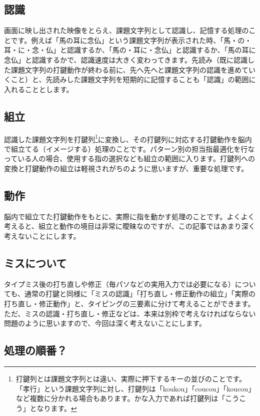 \subsection{認識}

画面に映し出された映像をとらえ、課題文字列として認識し、記憶する処理のことです。例えば「馬の耳に念仏」という課題文字列が表示された時、「馬・の・耳・に・念・仏」と認識するか、「馬の・耳に・念仏」と認識するか、「馬の耳に念仏」と認識するかで、認識速度は大きく変わってきます。先読み（既に認識した課題文字列の打鍵動作が終わる前に、先へ先へと課題文字列の認識を進めていくこと）と、先読みした課題文字列を短期的に記憶することも「認識」の範囲に入れることとします。

\subsection{組立}

認識した課題文字列を打鍵列\footnote{打鍵列とは課題文字列とは違い、実際に押下するキーの並びのことです。「孝行」という課題文字列に対し、打鍵列は「koukou」「coucou」「koucou」など複数に分かれる場合もあります。かな入力であれば打鍵列は「こうこう」となります。}に変換し、その打鍵列に対応する打鍵動作を脳内で組立てる（イメージする）処理のことです。パターン別の担当指最適化を行なっている人の場合、使用する指の選択なども組立の範囲に入ります。打鍵列への変換と打鍵動作の組立は軽視されがちのように思いますが、重要な処理です。

\subsection{動作}

脳内で組立てた打鍵動作をもとに、実際に指を動かす処理のことです。よくよく考えると、組立と動作の境目は非常に曖昧なのですが、この記事ではあまり深く考えないことにします。

\subsection{ミスについて}

タイプミス後の打ち直しや修正（毎パソなどの実用入力では必要になる）についても、通常の打鍵と同様に「ミスの認識」「打ち直し・修正動作の組立」「実際の打ち直し・修正動作」と、タイピングの三要素に分けて考えることができます。ただ、ミスの認識・打ち直し・修正などは、本来は別枠で考えなければならない問題のように思いますので、今回は深く考えないことにします。

\subsection{処理の順番？}

